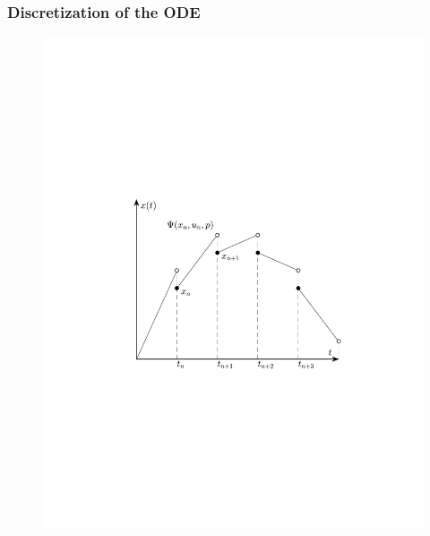\begin{frame}
	\frametitle{Discretization of the ODE}
	
	\begin{figure}[bth]
	  \begin{center}
	    \includegraphics[trim=1cm 5cm 0cm 8cm, clip=true, width=\linewidth]{img/multShootPlot}
	  \end{center}
	\end{figure}
\end{frame}


